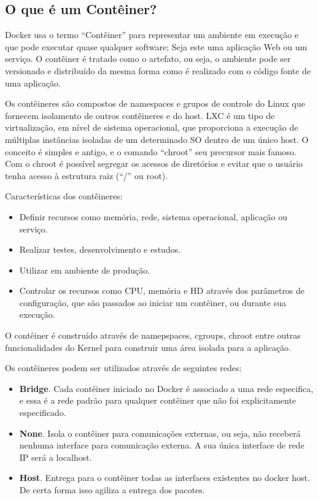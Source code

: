\documentclass[a4paper,11pt]{article}
\begin{document}
\subsection{O que é um Contêiner?}
Docker usa o termo ``Contêiner'' para representar um ambiente em execução e que pode executar quase qualquer software; Seja este uma aplicação Web ou um serviço. O contêiner é tratado como o artefato, ou seja, o ambiente pode ser versionado e distribuído da mesma forma como é realizado com o código fonte de uma aplicação. 

Os contêineres são compostos de namespaces e grupos de controle do Linux que fornecem isolamento de outros contêineres e do host. LXC é um tipo de virtualização, em nível de sistema operacional, que proporciona a execução de múltiplas instâncias isoladas de um determinado SO dentro de um único host. O conceito é simples e antigo, e o comando ``chroot'' seu precursor mais famoso. Com o chroot é possível segregar os acessos de diretórios e evitar que o usuário tenha acesso à estrutura raiz (“/” ou root).

Características dos contêineres: \vspace{-1em}
\begin{itemize}
  \item Definir recursos como memória, rede, sistema operacional, 
aplicação ou serviço. 
  \item Realizar testes, desenvolvimento e estudos.
  \item Utilizar em ambiente de produção.
  \item Controlar os recursos como CPU, memória e HD através dos parâmetros 
de configuração, que são passados ao iniciar um contêiner, ou durante sua 
execução.
\end{itemize}
O contêiner é construído através de namepspaces, cgroups, chroot entre outras 
funcionalidades do Kernel para construir uma área isolada para a aplicação.

Os contêineres podem ser utilizados através de seguintes redes: \vspace{-1em}
\begin{itemize}
  \item \textbf{Bridge}. Cada contêiner iniciado no Docker é associado a uma rede especifica, e essa é a rede padrão para qualquer contêiner que não foi explicitamente especificado.
  \item \textbf{None}. Isola o contêiner para comunicações externas, ou seja, não receberá nenhuma interface para comunicação externa. A sua única interface de rede IP será a localhost.
  \item \textbf{Host}. Entrega para o contêiner todas as interfaces existentes no docker host. De certa forma isso agiliza a entrega dos pacotes.
\end{itemize}
\end{document}
